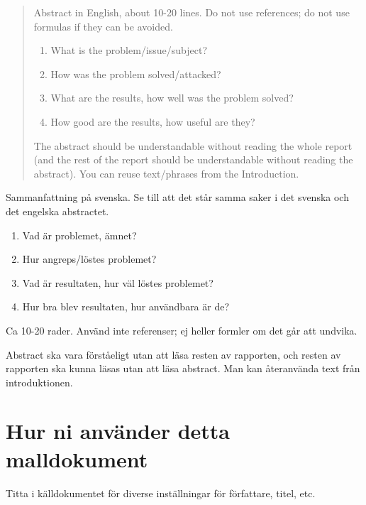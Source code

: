 \documentclass[a4paper,12pt]{article}
\begin{document}
\begin{abstract}
Abstract in English, about 10-20 lines. Do not use references; do not use formulas if they can be avoided.
\begin{enumerate}
\item What is the problem/issue/subject?
\item How was the problem solved/attacked?
\item What are the results, how well was the problem solved?
\item How good are the results, how useful are they?
\end{enumerate}
The abstract should be understandable without reading the whole report (and the rest of the report should be understandable without reading the abstract). You can reuse text/phrases from the Introduction.
\end{abstract}
\begin{sammanfattning}
Sammanfattning på svenska. Se till att det står samma saker i det svenska och det engelska abstractet.
\begin{enumerate}
\item Vad är problemet, ämnet?
\item Hur angreps/löstes problemet?
\item Vad är resultaten, hur väl löstes problemet?
\item Hur bra blev resultaten, hur användbara är de?
\end{enumerate}

Ca 10-20 rader. Använd inte referenser; ej heller formler om det går att undvika.

Abstract ska vara förståeligt utan att läsa resten av rapporten, och resten av rapporten ska kunna läsas utan att läsa abstract. Man kan återanvända text från introduktionen.
\end{sammanfattning}

\tableofcontents


\cleardoublepage


\mainmatter


\section*{Hur ni använder detta malldokument}
Titta i källdokumentet för diverse inställningar för författare, titel, etc.
\end{document}
